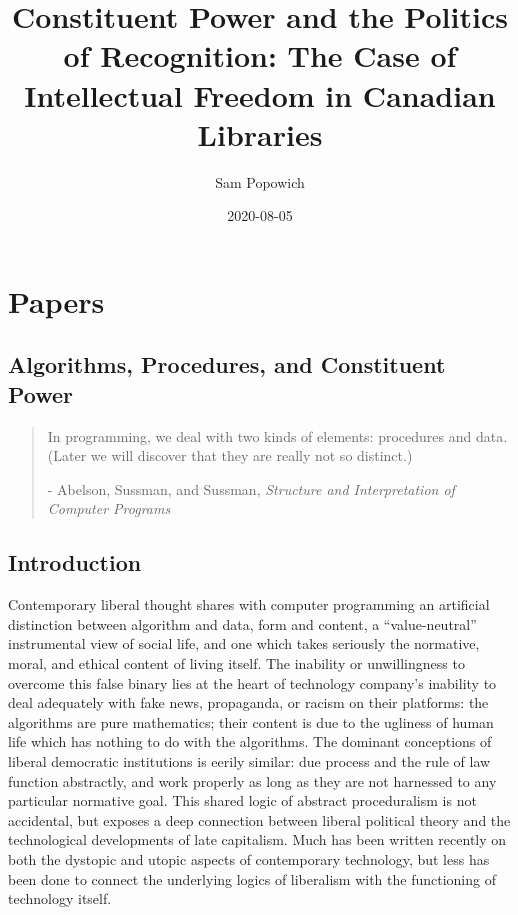 \documentclass[12pt,oneside]{memoir}
\title{Constituent Power and the Politics of Recognition: The Case of Intellectual Freedom in Canadian Libraries}
\author{Sam Popowich}
\date{2020-08-05}
\begin{document}
\maketitle
\clearpage


\tableofcontents


\newpage
\setcounter{page}{1}

\mainmatter

\chapter{Papers}
\label{scrivauto:5}

\section{Algorithms, Procedures, and Constituent Power}
\label{scrivauto:6}


\begin{quote}

In programming, we deal with two kinds of elements: procedures and data. (Later we will discover that they are really not so distinct.) 

- Abelson, Sussman, and Sussman, \emph{Structure and Interpretation of Computer Programs}

\end{quote}

\section*{Introduction}

Contemporary liberal thought shares with computer programming an artificial distinction between algorithm and data, form and content, a ``value-neutral'' instrumental view of social life, and one which takes seriously the normative, moral, and ethical content of living itself. The inability or unwillingness to overcome this false binary lies at the heart of technology company's inability to deal adequately with fake news, propaganda, or racism on their platforms: the algorithms are pure mathematics; their content is due to the ugliness of human life which has nothing to do with the algorithms. The dominant conceptions of liberal democratic institutions is eerily similar: due process and the rule of law function abstractly, and work properly as long as they are not harnessed to any particular normative goal. This shared logic of abstract proceduralism is not accidental, but exposes a deep connection between liberal political theory and the technological developments of late capitalism. Much has been written recently on both the dystopic and utopic aspects of contemporary technology, but less has been done to connect the underlying logics of liberalism with the functioning of technology itself.
\end{document}
